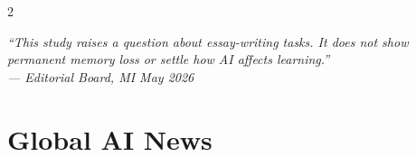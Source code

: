 \documentclass[10pt, a4paper]{article}
\begin{document}
\begin{multicols}{2}
\begin{pullquote}
  {\small\color{white}\itshape
  ``This study raises a question about essay-writing tasks. It does not
  show permanent memory loss or settle how AI affects learning.''\\[4pt]
  {\footnotesize\color{electric}--- Editorial Board, MI May 2026}}
\end{pullquote}

\end{multicols}

\clearpage

\section{Global AI News}
\end{document}
